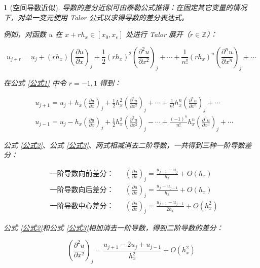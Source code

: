 \documentclass[zihao=5,UTF8]{report}
\def\Z{\mathbb{Z}}
\theoremstyle{MyTheoremStyle} %
\theoremstyle{MySubsubsectionStyle} %
\newtheorem{definition}{}
\begin{document}
\begin{definition}[空间导数近似]
导数的差分近似可由泰勒公式推得：在固定其它变量的情况下，对单一变元使用 Talor 公式以求得导数的差分表达式。

例如，对函数 $u$ 在 $x+rh_x \in [x_0,x_e]$ 处进行 Talor 展开（$r \in \Z $）：

\begin{equation}\label{公式1}
    u_{j+r}=u_j+(rh_x)\left(\frac{\partial u}{\partial x}\right)_j+\frac{1}{2}(rh_x)^2\left(\frac{\partial^2u}{\partial x^2}\right)_j+\cdots+\frac{1}{n!}(rh_x)^n\left(\frac{\partial^nu}{\partial x^n}\right)_j+\cdots 
\end{equation}

在公式 \ref{公式1} 中令 $r = -1,1$ 得到：

\begin{align}
    &u_{j+1}=u_{j}+h_x\left(\frac{\partial u}{\partial x}\right)_{j}+\frac{1}{2}h_x^{2}\left(\frac{\partial^{2}u}{\partial x^{2}}\right)_{j}+\cdots+\frac{1}{n!}h_x^{n}\left(\frac{\partial^{n}u}{\partial x^{n}}\right)_{j}+\cdots \label{公式2}  \\ 
    &u_{j-1}=u_j-h_x\left(\frac{\partial u}{\partial x}\right)_j+\frac{1}{2}h_x^2\left(\frac{\partial^2u}{\partial x^2}\right)_j-\cdots+\frac{(-1)^n}{n!}h_x^n\left(\frac{\partial^nu}{\partial x^n}\right)_j+\cdots \label{公式3}
\end{align}

公式 \ref{公式2}、公式 \ref{公式3}、两式相减消去二阶导数，一共得到三种一阶导数差分：

\begin{equation}
\begin{aligned}
    &\text{一阶导数向前差分：}&& \left(\frac{\partial u }{\partial x }\right)_{j} = \frac{u_{j+1}-u_j}{h_x}  + O(h_x)\\ 
    &\text{一阶导数向后差分：}&& \left(\frac{\partial u }{\partial x }\right)_{j} = \frac{u_{j}-u_{j-1}}{h_x}  + O(h_x)\\ 
    &\text{一阶导数中心差分：}&& \left(\frac{\partial u }{\partial x }\right)_{j} = \frac{u_{j+1}-u_{j-1}}{2h_x}  + O(h_x^2)
\end{aligned}
\end{equation}

公式 \ref{公式2}和公式 \ref{公式3}相加消去一阶导数，得到二阶导数的差分：

\begin{equation}
    \left(\frac{\partial^2u}{\partial x^2}\right)_j=\frac{u_{j+1}-2u_j+u_{j-1}}{h_x^2}+O(h_x^2)
\end{equation}

\end{definition}
\end{document}
